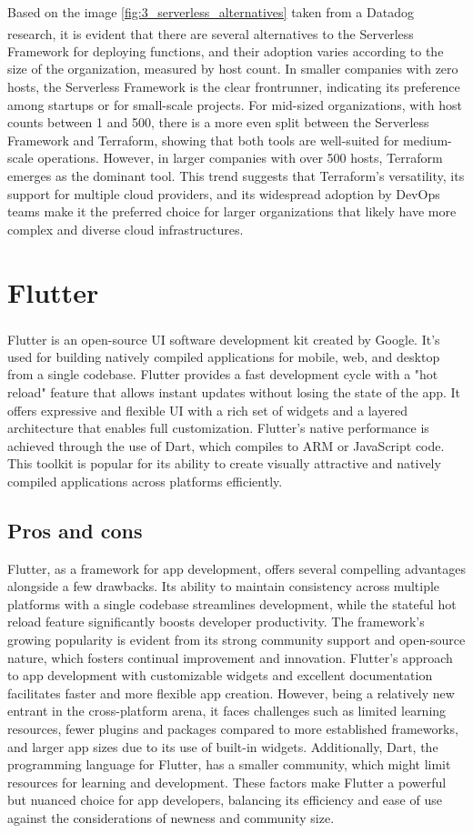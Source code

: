 Based on the image \ref{fig:3_serverless_alternatives} taken from a Datadog
research\textsuperscript{\cite{tech_14}}, it is evident that there are several alternatives to the
Serverless Framework for deploying functions, and their adoption varies according to the size of the
organization, measured by host count. In smaller companies with zero hosts, the Serverless Framework
is the clear frontrunner, indicating its preference among startups or for small-scale projects. For
mid-sized organizations, with host counts between 1 and 500, there is a more even split between the
Serverless Framework and Terraform, showing that both tools are well-suited for medium-scale
operations. However, in larger companies with over 500 hosts, Terraform emerges as the dominant
tool. This trend suggests that Terraform's versatility, its support for multiple cloud providers,
and its widespread adoption by DevOps teams make it the preferred choice for larger organizations
that likely have more complex and diverse cloud infrastructures.

\section{Flutter}
Flutter\textsuperscript{\cite{tech_15}} is an open-source UI software development kit created by
Google. It's used for building natively compiled applications for mobile, web, and desktop from a
single codebase. Flutter provides a fast development cycle with a "hot reload" feature that allows
instant updates without losing the state of the app. It offers expressive and flexible UI with a
rich set of widgets and a layered architecture that enables full customization. Flutter's native
performance is achieved through the use of Dart, which compiles to ARM or JavaScript code. This
toolkit is popular for its ability to create visually attractive and natively compiled applications
across platforms efficiently.

\subsection{Pros and cons}
Flutter, as a framework for app development, offers several compelling advantages alongside a few
drawbacks. Its ability to maintain consistency across multiple platforms with a single codebase
streamlines development, while the stateful hot reload feature significantly boosts developer
productivity. The framework's growing popularity is evident from its strong community support and
open-source nature, which fosters continual improvement and innovation. Flutter's approach to app
development with customizable widgets and excellent documentation facilitates faster and more
flexible app creation. However, being a relatively new entrant in the cross-platform arena, it faces
challenges such as limited learning resources, fewer plugins and packages compared to more
established frameworks, and larger app sizes due to its use of built-in widgets. Additionally, Dart,
the programming language for Flutter, has a smaller community, which might limit resources for
learning and development. These factors make Flutter a powerful but nuanced choice for app
developers, balancing its efficiency and ease of use against the considerations of newness and
community size.

